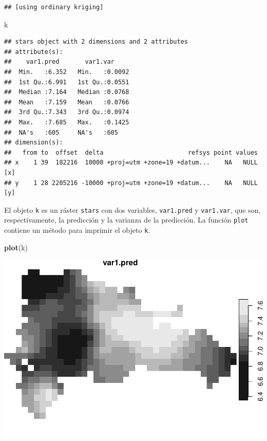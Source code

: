 \documentclass[11pt,]{article}
\newenvironment{Shaded}{\begin{snugshade}}{\end{snugshade}}
\newcommand{\KeywordTok}[1]{\textcolor[rgb]{0.13,0.29,0.53}{\textbf{#1}}}
\newcommand{\NormalTok}[1]{#1}
\begin{document}
\begin{verbatim}
## [using ordinary kriging]
\end{verbatim}

\begin{Shaded}
\begin{Highlighting}[]
\NormalTok{k}
\end{Highlighting}
\end{Shaded}

\begin{verbatim}
## stars object with 2 dimensions and 2 attributes
## attribute(s):
##    var1.pred       var1.var      
##  Min.   :6.352   Min.   :0.0092  
##  1st Qu.:6.991   1st Qu.:0.0551  
##  Median :7.164   Median :0.0768  
##  Mean   :7.159   Mean   :0.0766  
##  3rd Qu.:7.343   3rd Qu.:0.0974  
##  Max.   :7.685   Max.   :0.1425  
##  NA's   :605     NA's   :605     
## dimension(s):
##   from to  offset  delta                       refsys point values    
## x    1 39  182216  10000 +proj=utm +zone=19 +datum...    NA   NULL [x]
## y    1 28 2205216 -10000 +proj=utm +zone=19 +datum...    NA   NULL [y]
\end{verbatim}

El objeto \texttt{k} es un ráster \texttt{stars} con dos variables,
\texttt{var1.pred} y \texttt{var1.var}, que son, respectivamente, la
predicción y la varianza de la predicción. La función \texttt{plot}
contiene un método para imprimir el objeto \texttt{k}.

\begin{Shaded}
\begin{Highlighting}[]
\KeywordTok{plot}\NormalTok{(k)}
\end{Highlighting}
\end{Shaded}

\includegraphics[width=800px]{Proyecto-Precipitaciones_files/figure-latex/krige-plot-raw-1}
\end{document}
